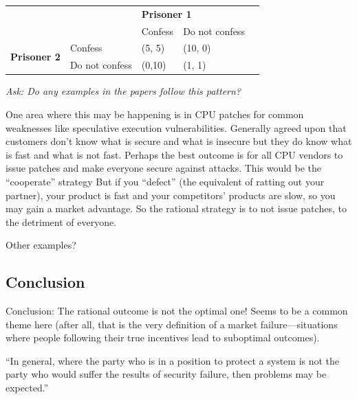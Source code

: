 \documentclass[11pt]{article}
\begin{document}
\begin{table}[]
    \centering
    \begin{tabular}{|ll|ll|l}
    \cline{1-4}
    \multicolumn{2}{|l|}{\multirow{2}{*}{}}                                     & \multicolumn{2}{l|}{\textbf{Prisoner 1}}      &  \\ \cline{3-4}
    \multicolumn{2}{|l|}{}                                                      & \multicolumn{1}{l|}{Confess} & Do not confess &  \\ \cline{1-4}
    \multicolumn{1}{|l|}{\multirow{2}{*}{\textbf{Prisoner 2}}} & Confess        & \multicolumn{1}{l|}{(5, 5)}  & (10, 0)        &  \\ \cline{2-4}
    \multicolumn{1}{|l|}{}                                     & Do not confess & \multicolumn{1}{l|}{(0,10)}  & (1, 1)         &  \\ \cline{1-4}
    \end{tabular}
\end{table}

{\it Ask: Do any examples in the papers follow this pattern?}

One area where this may be happening is in CPU patches for common weaknesses like speculative execution vulnerabilities. 
Generally agreed upon that customers don't know what is secure and what is insecure but they do know what is fast and what is not fast.  Perhaps the best outcome is for all CPU vendors to issue patches and make everyone secure against attacks. This would be the ``cooperate'' strategy
But if you “defect” (the equivalent of ratting out your partner), your product is fast and your competitors’ products are slow, so you may gain a market advantage.
So the rational strategy is to not issue patches, to the detriment of everyone. 

Other examples? 


\subsection{Conclusion}

Conclusion: The rational outcome is not the optimal one! Seems to be a common theme here (after all, that is the very definition of a market failure---situations where people following their true incentives lead to suboptimal outcomes).


“In general, where the party who is in a position to protect a system is not the party who would suffer the results of security failure, then problems may be expected.”
\end{document}
